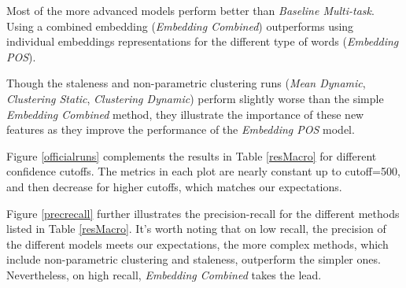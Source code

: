 \documentclass{article}
\begin{document}
{{Most of the more advanced models perform better than {\textit{Baseline Multi-task}}. Using a combined embedding ({\textit{Embedding Combined}}) outperforms using individual embeddings representations for the different type of words ({\textit{Embedding POS}}).

Though the staleness and non-parametric clustering runs ({\textit{Mean Dynamic}}, {\textit{Clustering Static}}, {\textit{Clustering Dynamic}}) perform slightly worse than the simple {\textit{Embedding Combined}} method, they illustrate the importance of these new features as they improve the performance of the {\textit{Embedding POS}} model.

Figure \ref{officialruns} complements the results in Table \ref{resMacro} for different confidence cutoffs. The metrics in each plot are nearly constant up to cutoff=500, and then decrease for higher cutoffs, which matches our expectations.

Figure \ref{precrecall} further illustrates the precision-recall for the different methods listed in Table \ref{resMacro}. It's worth noting that on low recall, the precision of the different models meets our expectations, the more complex methods, which include non-parametric clustering and staleness, outperform the simpler ones. Nevertheless, on high recall, {\textit{Embedding Combined}} takes the lead.


}}
\end{document}

